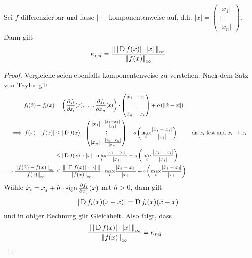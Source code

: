 \begin{Leme}
  \label{3.2.17}
  Sei $f$ differenzierbar und fasse $|\,\cdot\,|$ komponentenweise auf,
  d.h. $|x| = \begin{pmatrix}
    |x_1| \\
    \vdots \\
    |x_n|
  \end{pmatrix}$.
  Dann gilt
  \begin{gather}
    \kappa_{rel} = \frac{\nn[\,|\D f(x)|\cdot|x|\,]_\infty}{\nn[f(x)]_\infty}
    \label{III.2.16}
  \end{gather}
\end{Leme}

\begin{proof}
  Vergleiche seien ebenfalls komponentenweise zu verstehen.
  Nach dem Satz von Taylor gilt
  \begin{align*}
    f_i(\tilde{x})-f_i(x) 
    &= \left( 
      \frac{\partial f_i}{\partial x_i}(x),
      \dotsc ,\frac{\partial f_i}{\partial x_n}(x) 
      \right)
      \cdot \begin{pmatrix}
        \tilde{x}_1-x_1 \\
        \vdots \\
        \tilde{x}_n-x_n
      \end{pmatrix}
    + o\left(\nn[\tilde{x}-x]\right) \\
    \Longrightarrow 
    |f(\tilde{x})-f(x)|
    &\leq |\D f(x)|
      \cdot \begin{pmatrix}
        |x_1|\cdot \frac{|\tilde{x}_1-x_1|}{|x_1|}\\
        \vdots \\
        |x_n|\cdot \frac{|\tilde{x}_n-x_n|}{|x_n|}
      \end{pmatrix}
    + o\left(
    \underset{i}{\max} \frac{|\tilde{x}_i-x_i|}{|x_i|}
    \right)
    && \text{da $x_i$ fest und $\tilde{x}_i\to x_i$} \\
    &\leq |\D f(x)| \cdot |x| 
      \cdot \underset{i}{\max} \frac{|\tilde{x}_i-x_i|}{|x_i|}
      + o\left(
      \underset{i}{\max} \frac{|\tilde{x}_i-x_i|}{|x_i|}
      \right) \\
    \Longrightarrow \frac{\nn[f(\tilde{x})-f(x)]_\infty}{\nn[f(x)]_\infty}
    &\leq  \frac{\nn[\,|\D f(x)|\cdot |x| \,]}{\nn[f(x)]_\infty}
      \cdot \underset{i}{\max}\frac{|\tilde{x}_i-x_i|}{|x_i|}
      + o\left( 
      \underset{i}{\max} \frac{|\tilde{x}_i-x_i|}{|x_i|} 
      \right)
  \end{align*}
  Wähle $\tilde{x}_i = x_j+h\cdot \Sign \frac{\partial f_i}{\partial x_j}(x)$ mit $h>0$,
  dann gilt
  \begin{gather*}
    |\D f_i(x)(\tilde{x}-x)| = \D f_i(x)(\tilde{x}-x)
  \end{gather*}
  und in obiger Rechnung gilt Gleichheit.
  Also folgt, dass
  \begin{align*}
    \frac{\nn[\,|\D f(x)|\cdot |x| \, ]_\infty}{\nn[f(x)]_\infty} &= \kappa_{rel} 
  \end{align*}
\end{proof}

